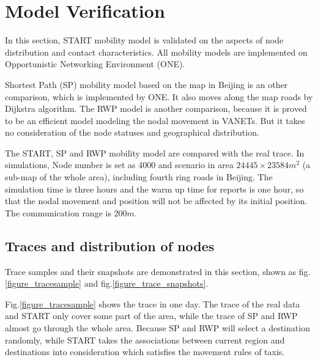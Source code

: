 \section{Model Verification}
\label{section_model_varification}
In this section, START mobility model is validated on the aspects of node distribution and contact characteristics. All mobility models are implemented on Opportunistic Networking Environment (ONE)\cite{KeranenOtt-155}.

Shortest Path (SP) mobility model based on the map in Beijing is an other comparison, which is implemented by ONE.  It also moves along the map roads by Dijkstra algorithm.
The RWP model is another comparison, because it is proved to be an efficient model modeling the nodal movement in VANETs. But it takes no consideration of the node statuses and geographical distribution.

The START, SP and RWP mobility model are compared with the real trace.
In simulations, Node number is set as 4000 and scenario in area $24445\times23584 m^2$ (a sub-map of the whole area), including fourth ring roads in Beijing. The simulation time is three hours and the warm up time for reports is one hour, so that the nodal movement and position will not be affected by its initial position. The communication range is $200m$.

\subsection{Traces and distribution of nodes}

Trace samples and their snapshots are demonstrated in this section, shown as fig. \ref{figure_tracesample} and fig.\ref{figure_trace_snapshots}.




Fig.\ref{figure_tracesample} shows the trace in one day. The trace of the real data and START only cover some part of the area, while the trace of SP and RWP almost go through the whole area. Because SP and RWP will select a destination randomly, while START takes the associations between current region and destinations into consideration which satisfies the movement rules of taxis.

